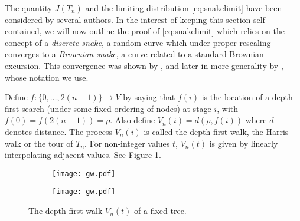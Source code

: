 \documentclass[11pt]{article}
\def\r{\rho}
\numberwithin{theorem}{section}
\theoremstyle{definition}
\numberwithin{equation}{section}
\begin{document}
The quantity $J(T_n)$ and the limiting distribution \eqref{eq:snakelimit}
have been considered by several authors.
In the interest of keeping this section
self-contained, we will now outline the proof of \eqref{eq:snakelimit} which
relies on the concept 
of a {\em discrete snake}, a random curve which under proper rescaling
converges to a \emph{Brownian snake}, a curve related to a standard
Brownian excursion. 
This convergence was shown by \citet{MR2033198}, and later in more generality by
\citet{jm05}, whose notation we use.

Define $f:\{0,\dots,2(n-1)\}\to V$ by saying that $f(i)$ is the location of a depth-first search
(under some fixed ordering of nodes) at stage $i$, with $f(0) = f(2(n-1)) = \r$. Also define $V_n(i) =
d(\r, f(i))$ where $d$ denotes distance. The process $V_n(i)$ is called the depth-first walk, the
Harris walk or the tour of $T_n$. For non-integer values $t$, $V_n(t)$ is given by linearly
interpolating adjacent values. See Figure \ref{fig:dfw}.
\begin{figure}[ht]
\centering
\begin{subfigure}{0.4\textwidth}
\texttt{[image: gw.pdf]}
\end{subfigure}
\begin{subfigure}{0.5\textwidth}
\texttt{[image: gw.pdf]}
\end{subfigure}
\caption{The depth-first walk $V_n(t)$ of a fixed tree.}
\label{fig:dfw}
\end{figure}
\end{document}
